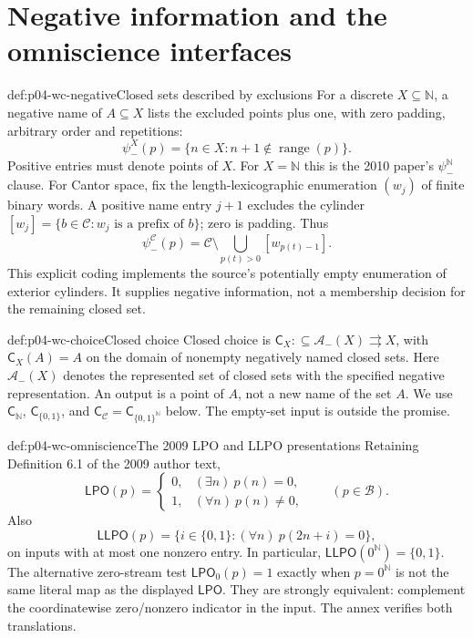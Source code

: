\section{Negative information and the omniscience interfaces}
\label{sec:p04-wc-choice-definitions}

\begin{hbdefinition}{def:p04-wc-negative}{Closed sets described by exclusions}
For a discrete \(X\subseteq\mathbb N\), a negative name of
\(A\subseteq X\) lists the excluded points plus one, with zero
padding, arbitrary order and repetitions:
\[
 \psi_-^X(p)=\{n\in X:n+1\notin\operatorname{range}(p)\}.
\]
Positive entries must denote points of \(X\). For \(X=\mathbb N\)
this is the 2010 paper's \(\psi_-^{\mathbb N}\) clause.
For Cantor space, fix the length-lexicographic enumeration
\((w_j)\) of finite binary words. A positive name entry \(j+1\)
excludes the cylinder
\([w_j]=\{b\in\mathcal C:w_j\text{ is a prefix of }b\}\);
zero is padding. Thus
\[
 \psi_-^{\mathcal C}(p)=
 \mathcal C\setminus\bigcup_{p(t)>0}[w_{p(t)-1}].
\]
This explicit coding implements the source's potentially empty
enumeration of exterior cylinders. It supplies negative information,
not a membership decision for the remaining closed set.
\end{hbdefinition}

\begin{hbdefinition}{def:p04-wc-choice}{Closed choice}
Closed choice is
\(\mathsf{C}_X:\subseteq\mathcal A_-(X)\rightrightarrows X\), with
\(\mathsf{C}_X(A)=A\) on the domain of nonempty negatively named closed sets.
Here \(\mathcal A_-(X)\) denotes the represented set of closed sets
with the specified negative representation. An output is a point of
\(A\), not a new name of the set \(A\).
We use \(\mathsf{C}_{\mathbb N}\), \(\mathsf{C}_{\{0,1\}}\), and
\(\mathsf{C}_{\mathcal C}=\mathsf{C}_{\{0,1\}^{\mathbb N}}\) below.
The empty-set input is outside the promise.
\end{hbdefinition}

\begin{hbdefinition}{def:p04-wc-omniscience}{The 2009 LPO and LLPO presentations}
Retaining Definition 6.1 of the 2009 author text,
\[
 \mathsf{LPO}(p)=
 \begin{cases}0,&(\exists n)\ p(n)=0,\\1,&(\forall n)\ p(n)\ne0,
 \end{cases}
 \qquad(p\in\mathcal B).
\]
Also
\[
 \mathsf{LLPO}(p)=\{i\in\{0,1\}:(\forall n)\ p(2n+i)=0\},
\]
on inputs with at most one nonzero entry. In particular,
\(\mathsf{LLPO}(0^{\mathbb N})=\{0,1\}\).
The alternative zero-stream test
\(\mathsf{LPO}_0(p)=1\) exactly when \(p=0^{\mathbb N}\)
is not the same literal map as the displayed \(\mathsf{LPO}\).
They are strongly equivalent: complement the coordinatewise zero/nonzero
indicator in the input. The annex verifies both translations.
\end{hbdefinition}

